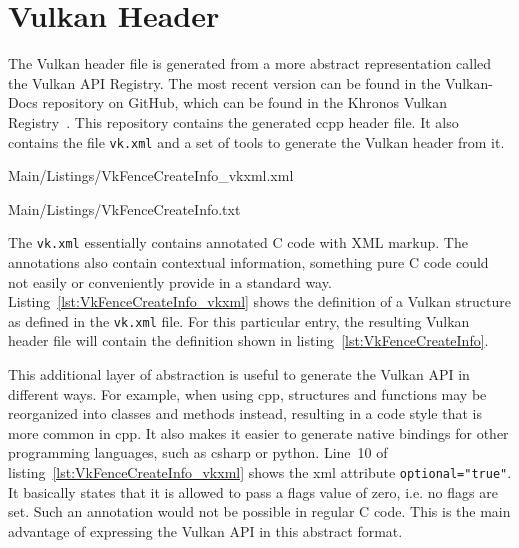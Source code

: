   \section{Vulkan Header}
  \label{sec:VulkanHeader}
    The Vulkan header file is generated from a more abstract representation called the Vulkan API Registry.
    The most recent version can be found in the Vulkan-Docs repository on GitHub, which can be found in the Khronos Vulkan Registry~\cite{vulkanregistry}.
    This repository contains the generated \gls{ccpp} header file.
    It also contains the file \lstinline{vk.xml} and a set of tools to generate the Vulkan header from it.

    
    {Main/Listings/VkFenceCreateInfo_vkxml.xml}

    
    {Main/Listings/VkFenceCreateInfo.txt}

    The \lstinline{vk.xml} essentially contains annotated C code with XML markup.
    The annotations also contain contextual information, something pure C code could not easily or conveniently provide in a standard way.
    Listing~\ref{lst:VkFenceCreateInfo_vkxml} shows the definition of a Vulkan structure as defined in the \lstinline{vk.xml} file.
    For this particular entry, the resulting Vulkan header file will contain the definition shown in listing~\ref{lst:VkFenceCreateInfo}.

    This additional layer of abstraction is useful to generate the Vulkan API in different ways.
    For example, when using \gls{cpp}, structures and functions may be reorganized into classes and methods instead, resulting in a code style that is more common in \gls{cpp}.
    It also makes it easier to generate native bindings for other programming languages, such as \gls{csharp} or \gls{python}.
    Line~10 of listing~\ref{lst:VkFenceCreateInfo_vkxml} shows the xml attribute \lstinline{optional="true"}.
    It basically states that it is allowed to pass a flags value of zero, i.e. no flags are set.
    Such an annotation would not be possible in regular C code.
    This is the main advantage of expressing the Vulkan API in this abstract format.


